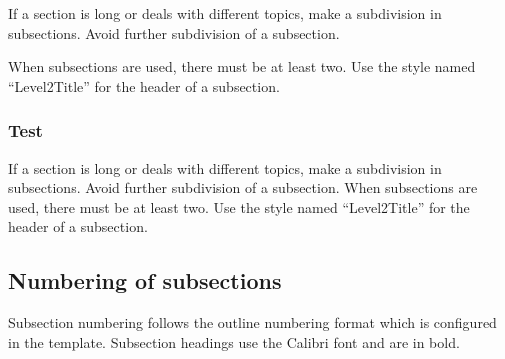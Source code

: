 \documentclass[10pt]{imeko_acta}
\begin{document}
If a section is long or deals with different topics, make a subdivision in subsections. Avoid further subdivision of a subsection. 

When subsections are used, there must be at least two. Use the style named ``Level2Title'' for the header of a subsection.

\subsubsection{Test}
If a section is long or deals with different topics, make a subdivision in subsections. Avoid further subdivision of a subsection. When subsections are used, there must be at least two. Use the style named ``Level2Title'' for the header of a subsection.


\subsection{Numbering of subsections}

Subsection numbering follows the outline numbering format which is configured in the template. Subsection headings use the Calibri font and are in bold.




\end{document}
